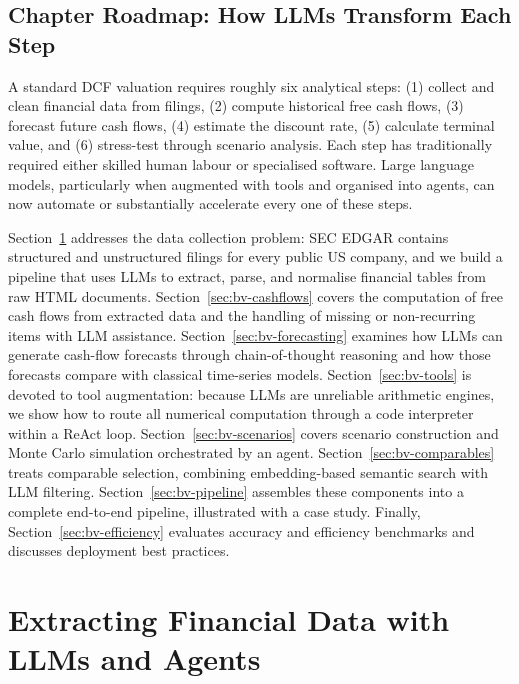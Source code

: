 \begin{context}
\subsection{Chapter Roadmap: How LLMs Transform Each Step}
\label{subsec:bv-intro-roadmap}

A standard DCF valuation requires roughly six analytical steps: (1) collect and clean
financial data from filings, (2) compute historical free cash flows, (3) forecast
future cash flows, (4) estimate the discount rate, (5) calculate terminal value,
and (6) stress-test through scenario analysis. Each step has traditionally required
either skilled human labour or specialised software. Large language models, particularly
when augmented with tools and organised into agents, can now automate or substantially
accelerate every one of these steps.

Section~\ref{sec:bv-extraction} addresses the data collection problem: SEC EDGAR
contains structured and unstructured filings for every public US company, and we build
a pipeline that uses LLMs to extract, parse, and normalise financial tables from raw
HTML documents. Section~\ref{sec:bv-cashflows} covers the computation of free cash
flows from extracted data and the handling of missing or non-recurring items with
LLM assistance. Section~\ref{sec:bv-forecasting} examines how LLMs can generate
cash-flow forecasts through chain-of-thought reasoning and how those forecasts compare
with classical time-series models. Section~\ref{sec:bv-tools} is devoted to tool
augmentation: because LLMs are unreliable arithmetic engines, we show how to route
all numerical computation through a code interpreter within a ReAct loop.
Section~\ref{sec:bv-scenarios} covers scenario construction and Monte Carlo simulation
orchestrated by an agent. Section~\ref{sec:bv-comparables} treats comparable selection,
combining embedding-based semantic search with LLM filtering.
Section~\ref{sec:bv-pipeline} assembles these components into a complete end-to-end
pipeline, illustrated with a case study. Finally, Section~\ref{sec:bv-efficiency}
evaluates accuracy and efficiency benchmarks and discusses deployment best practices.
\end{context}


\section{Extracting Financial Data with LLMs and Agents}
\label{sec:bv-extraction}


